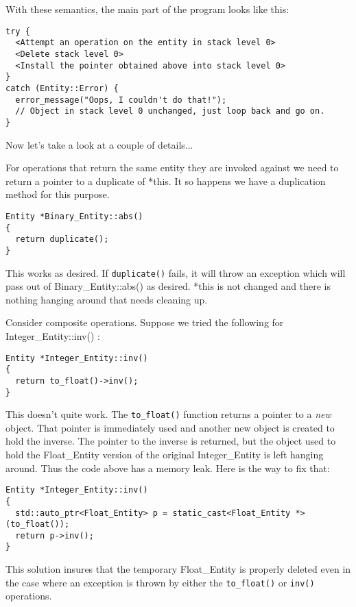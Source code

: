 \documentclass{report}
\begin{document}
With these semantics, the main part of the program looks like this:

\begin{verbatim}
try {
  <Attempt an operation on the entity in stack level 0>
  <Delete stack level 0>
  <Install the pointer obtained above into stack level 0>
}
catch (Entity::Error) {
  error_message("Oops, I couldn't do that!");
  // Object in stack level 0 unchanged, just loop back and go on.
}
\end{verbatim}

Now let's take a look at a couple of details...

For operations that return the same entity they are invoked against we need to return a pointer
to a duplicate of *this. It so happens we have a duplication method for this purpose.

\begin{verbatim}
Entity *Binary_Entity::abs()
{
  return duplicate();
}
\end{verbatim}

This works as desired. If \texttt{duplicate()} fails, it will throw an exception which will pass
out of Binary\_Entity::abs() as desired. *this is not changed and there is nothing hanging
around that needs cleaning up.

Consider composite operations. Suppose we tried the following for Integer\_Entity::inv() :

\begin{verbatim}
Entity *Integer_Entity::inv()
{
  return to_float()->inv();
}
\end{verbatim}

This doesn't quite work. The \texttt{to\_float()} function returns a pointer to a \emph{new}
object. That pointer is immediately used and another new object is created to hold the inverse.
The pointer to the inverse is returned, but the object used to hold the Float\_Entity version of
the original Integer\_Entity is left hanging around. Thus the code above has a memory leak. Here
is the way to fix that:

\begin{verbatim}
Entity *Integer_Entity::inv()
{
  std::auto_ptr<Float_Entity> p = static_cast<Float_Entity *>(to_float());
  return p->inv();
}
\end{verbatim}

This solution insures that the temporary Float\_Entity is properly deleted even in the case
where an exception is thrown by either the \texttt{to\_float()} or \texttt{inv()} operations.
\end{document}
